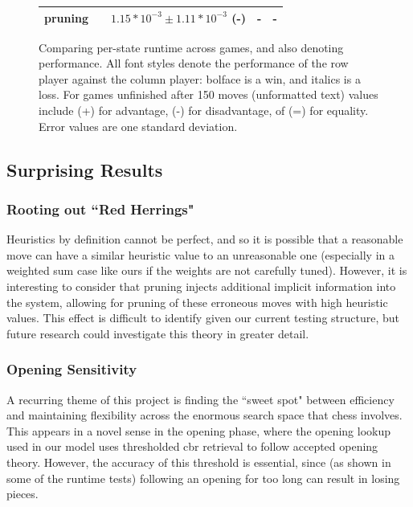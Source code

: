 \documentclass[letterpaper]{article}
\begin{document}
\begin{figure}[tb]
\begin{center}
\begin{tabular}{|c|c|c|c|c|}
            \hline
            pruning & & ${1.15*10^{-3}\pm1.11*10^{-3}}$ (-)& - &-\\
            \hline
        \end{tabular}
        \caption{Comparing per-state runtime across games, and also denoting performance.  All font styles denote the performance of the row player against the column player: bolface is a win, and italics is a loss.  For games unfinished after 150 moves (unformatted text) values include (+) for advantage, (-) for disadvantage, of (=) for equality.  Error values are one standard deviation.}
        \label{pruningEval}
    \end{center}
\end{figure}

\subsection{Surprising Results}
\subsubsection{Rooting out ``Red Herrings"}
Heuristics by definition cannot be perfect, and so it is possible that a reasonable move can have a similar heuristic value to an unreasonable one (especially in a weighted sum case like ours if the weights are not carefully tuned).  However, it is interesting to consider that pruning injects additional implicit information into the system, allowing for pruning of these erroneous moves with high heuristic values.  This effect is difficult to identify given our current testing structure, but future research could investigate this theory in greater detail.

\subsubsection{Opening Sensitivity}
A recurring theme of this project is finding the ``sweet spot" between efficiency and maintaining flexibility across the enormous search space that chess involves.  This appears in a novel sense in the opening phase, where the opening lookup used in our model uses thresholded \acrshort{cbr} retrieval to follow accepted opening theory.  However, the accuracy of this threshold is essential, since (as shown in some of  the runtime tests) following an opening for too long can result in losing pieces.
\end{document}
